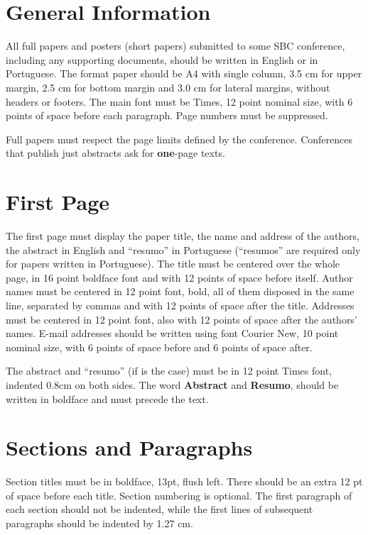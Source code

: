 \documentclass[12pt]{article}
\begin{document}
\section{General Information}

All full papers and posters (short papers) submitted to some SBC conference,
including any supporting documents, should be written in English or in
Portuguese. The format paper should be A4 with single column, 3.5 cm for upper
margin, 2.5 cm for bottom margin and 3.0 cm for lateral margins, without
headers or footers. The main font must be Times, 12 point nominal size, with 6
points of space before each paragraph. Page numbers must be suppressed.

Full papers must respect the page limits defined by the conference.
Conferences that publish just abstracts ask for \textbf{one}-page texts.


\section{First Page} \label{sec:firstpage}

The first page must display the paper title, the name and address of the
authors, the abstract in English and ``resumo'' in Portuguese (``resumos'' are
required only for papers written in Portuguese). The title must be centered
over the whole page, in 16 point boldface font and with 12 points of space
before itself. Author names must be centered in 12 point font, bold, all of
them disposed in the same line, separated by commas and with 12 points of
space after the title. Addresses must be centered in 12 point font, also with
12 points of space after the authors' names. E-mail addresses should be
written using font Courier New, 10 point nominal size, with 6 points of space
before and 6 points of space after.

The abstract and ``resumo'' (if is the case) must be in 12 point Times font,
indented 0.8cm on both sides. The word \textbf{Abstract} and \textbf{Resumo},
should be written in boldface and must precede the text.


\section{Sections and Paragraphs}

Section titles must be in boldface, 13pt, flush left. There should be an extra
12 pt of space before each title. Section numbering is optional. The first
paragraph of each section should not be indented, while the first lines of
subsequent paragraphs should be indented by 1.27 cm.
\end{document}
